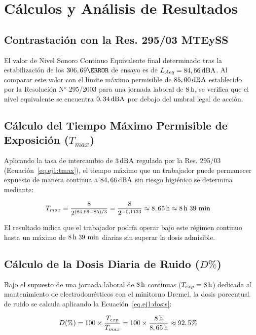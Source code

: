 \chapter{Cálculos y Análisis de Resultados}
\label{sec:analisis}

\section{Contrastación con la Res. 295/03 MTEySS}
El valor de Nivel Sonoro Continuo Equivalente final determinado tras la estabilización de los $306,69\s$ de ensayo
es de $L_{Aeq} = 84,66\,\mathrm{dBA}$. Al comparar este valor con el límite máximo permisible de $85,00\,\mathrm{dBA}$ establecido por la
Resolución N° 295/2003 para una jornada laboral de $8\,\mathrm{h}$, se verifica que el nivel equivalente se encuentra $0,34\,\mathrm{dBA}$ por
debajo del umbral legal de acción.

\section{Cálculo del Tiempo Máximo Permisible de Exposición ($T_{max}$)}
Aplicando la tasa de intercambio de $3\,\mathrm{dBA}$ regulada por la Res. 295/03 (Ecuación~\ref{eq.ej1:tmax}), el tiempo máximo
que un trabajador puede permanecer expuesto de manera continua a $84,66\,\mathrm{dBA}$ sin riesgo higiénico se determina mediante:

\begin{equation}
T_{max} = \frac{8}{2^{(84,66 - 85)/3}} = \frac{8}{2^{-0,1133}} \approx 8,65\,\mathrm{h} \approx 8\,\mathrm{h} \; 39\text{ min}
\end{equation}

El resultado indica que el trabajador podría operar bajo este régimen continuo hasta un máximo de $8\,\mathrm{h} \; 39\text{ min}$
diarias sin superar la dosis admisible.

\section{Cálculo de la Dosis Diaria de Ruido ($D\%$)}
Bajo el supuesto de una jornada laboral de $8\,\mathrm{h}$ continuas ($T_{exp} = 8\,\mathrm{h}$) dedicada al mantenimiento de electrodomésticos
con el minitorno Dremel, la dosis porcentual de ruido se calcula aplicando la Ecuación~\ref{eq.ej1:dosis}:

\begin{equation}
D(\%) = 100 \times \frac{T_{exp}}{T_{max}} = 100 \times \frac{8\,\mathrm{h}}{8,65\,\mathrm{h}} \approx 92,5\%
\end{equation}

